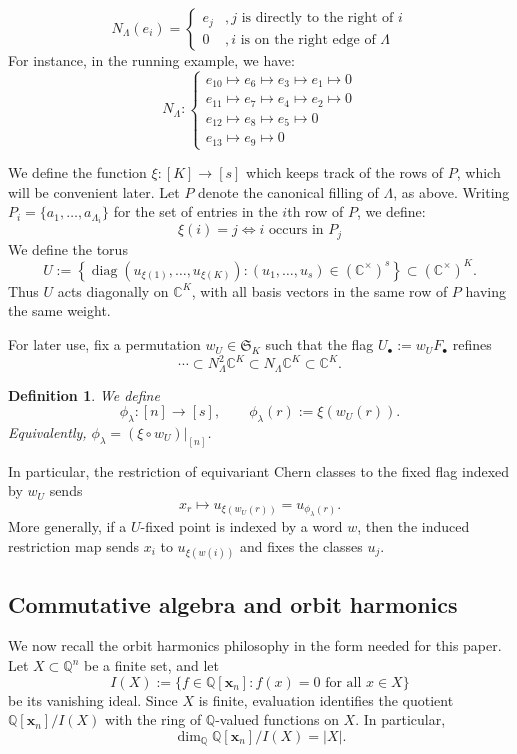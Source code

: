 \documentclass[11pt]{amsart}
\numberwithin{equation}{section}
\newtheorem{definition}[theorem]{Definition}
\theoremstyle{definition}
\newcommand{\symm}{{\mathfrak{S}}}
\newcommand{\CC}{{\mathbb{C}}}
\newcommand{\QQ}{{\mathbb{Q}}}
\newcommand{\xxx}{{\mathbf{x}}}
\begin{document}
\[
N_\Lambda(e_i) = \begin{cases}
    e_j & , j\text{ is directly to the right of }i \\
    0 & , i\text{ is on the right edge of }\Lambda
\end{cases}
\]
For instance, in the running example, we have:
\[
N_\Lambda: \begin{cases}
    e_{10} \mapsto e_6 \mapsto e_3 \mapsto e_1 \mapsto 0 \\
    e_{11} \mapsto e_7 \mapsto e_4 \mapsto e_2 \mapsto 0 \\
    e_{12} \mapsto e_8 \mapsto e_5 \mapsto 0 \\
    e_{13} \mapsto e_9 \mapsto 0
\end{cases}
\]

We define the function $\xi: [K] \to [s]$ which keeps track of the rows of $P$, which will be convenient later. Let $P$ denote the canonical filling of $\Lambda$, as above. Writing $P_i = \{a_1,\dots,a_{\Lambda_i}\}$ for the set of entries in the $i$th row of $P$, we define:
\[
\xi(i) = j \Leftrightarrow i \text{ occurs in }P_j
\]
We define the torus
\[
U:=\left\{\operatorname{diag}(u_{\xi(1)},\dots,u_{\xi(K)}):(u_1,\dots,u_s)\in
(\CC^\times)^s\right\}\subset (\CC^\times)^K.
\]
Thus $U$ acts diagonally on $\CC^K$, with all basis vectors in the same row of
$P$ having the same weight.

For later use, fix a permutation $w_U\in \symm_K$ such that
the flag $U_\bullet:=w_UF_\bullet$ refines
\[
\cdots\subset N_\Lambda^2\CC^K\subset N_\Lambda\CC^K\subset \CC^K.
\]
\begin{definition}\label{def: phi-lambda}
We define
\[
\phi_\lambda:[n]\to [s],\qquad \phi_\lambda(r):=\xi(w_U(r)).
\]
Equivalently, $\phi_\lambda=(\xi\circ w_U)|_{[n]}$.
\end{definition}
In particular, the restriction of equivariant Chern classes to the fixed flag
indexed by $w_U$ sends
\[
x_r\longmapsto u_{\xi(w_U(r))}=u_{\phi_\lambda(r)}.
\]
More generally, if a $U$-fixed point is indexed by a word $w$, then the induced
restriction map sends $x_i$ to $u_{\xi(w(i))}$ and fixes the classes $u_j$.

\subsection{Commutative algebra and orbit harmonics}

We now recall the orbit harmonics philosophy in the form needed for this paper.
Let $X \subset \QQ^n$ be a finite set, and let
\[
I(X):=\{f\in \QQ[\xxx_n] : f(x)=0 \text{ for all } x\in X\}
\]
be its vanishing ideal. Since $X$ is finite, evaluation identifies the quotient
$\QQ[\xxx_n]/I(X)$ with the ring of $\QQ$-valued functions on $X$. In particular,
\[
\dim_\QQ \QQ[\xxx_n]/I(X)=|X|.
\]
\end{document}
